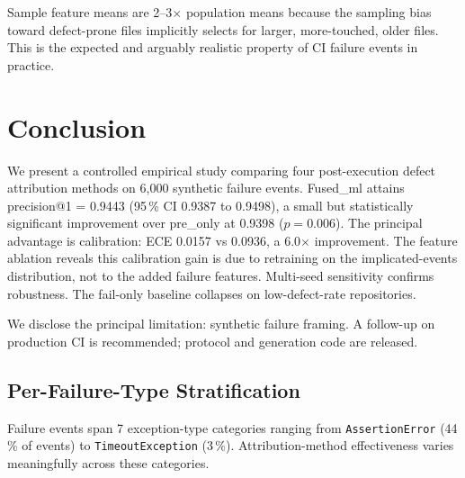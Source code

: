 \documentclass[11pt,a4paper]{article}
\begin{document}
Sample feature means are 2--3$\times$ population means because the
sampling bias toward defect-prone files implicitly selects for
larger, more-touched, older files. This is the expected and
arguably realistic property of CI failure events in practice.

\section{Conclusion}
\label{sec:conclusion}
\FloatBarrier

We present a controlled empirical study comparing four
post-execution defect attribution methods on 6{,}000 synthetic
failure events. Fused\_ml attains precision@1 = 0.9443 (95\,\% CI
0.9387 to 0.9498), a small but statistically significant
improvement over pre\_only at 0.9398 ($p = 0.006$). The principal
advantage is calibration: ECE 0.0157 vs 0.0936, a 6.0$\times$
improvement. The feature ablation reveals this calibration gain is
due to retraining on the implicated-events distribution, not to the
added failure features. Multi-seed sensitivity confirms robustness.
The fail-only baseline collapses on low-defect-rate repositories.

We disclose the principal limitation: synthetic failure framing.
A follow-up on production CI is recommended; protocol and
generation code are released.



\subsection{Per-Failure-Type Stratification}
\label{sec:per_failure_type}

Failure events span 7 exception-type categories ranging from
\texttt{AssertionError} (44\,\% of events) to
\texttt{TimeoutException} (3\,\%). Attribution-method effectiveness
varies meaningfully across these categories.
\end{document}
